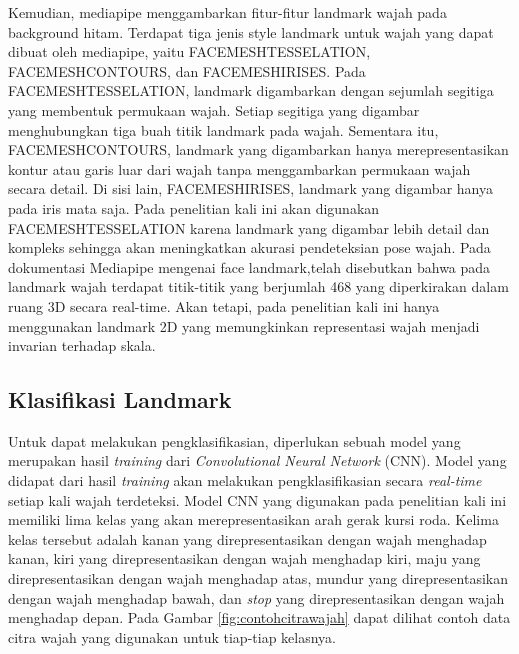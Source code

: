 Kemudian, mediapipe menggambarkan fitur-fitur landmark wajah pada background hitam. Terdapat tiga jenis style landmark untuk wajah yang dapat dibuat oleh mediapipe, yaitu FACEMESH\textunderscore TESSELATION, FACEMESH\textunderscore CONTOURS, dan FACEMESH\textunderscore IRISES. Pada FACEMESH\textunderscore TESSELATION, landmark digambarkan dengan sejumlah segitiga yang membentuk permukaan wajah. Setiap segitiga yang digambar menghubungkan tiga buah titik landmark pada wajah. Sementara itu, FACEMESH\textunderscore CONTOURS, landmark yang digambarkan hanya merepresentasikan kontur atau garis luar dari wajah tanpa menggambarkan permukaan wajah secara detail. Di sisi lain, FACEMESH\textunderscore IRISES, landmark yang digambar hanya pada iris mata saja. Pada penelitian kali ini akan digunakan FACEMESH\textunderscore TESSELATION karena landmark yang digambar lebih detail dan kompleks sehingga akan meningkatkan akurasi pendeteksian pose wajah. Pada dokumentasi Mediapipe mengenai face landmark,telah disebutkan bahwa pada landmark wajah terdapat titik-titik yang berjumlah 468 yang diperkirakan dalam ruang 3D secara real-time. Akan tetapi, pada penelitian kali ini hanya menggunakan landmark 2D yang memungkinkan representasi wajah menjadi invarian terhadap skala. 

\subsection{Klasifikasi Landmark}
Untuk dapat melakukan pengklasifikasian, diperlukan sebuah model yang merupakan hasil \emph{training} dari \emph{Convolutional Neural Network} (CNN). Model yang didapat dari hasil \emph{training} akan melakukan pengklasifikasian secara \emph{real-time} setiap kali wajah terdeteksi. Model CNN yang digunakan pada penelitian kali ini memiliki lima kelas yang akan merepresentasikan arah gerak kursi roda. Kelima kelas tersebut adalah kanan yang direpresentasikan dengan wajah menghadap kanan, kiri yang direpresentasikan dengan wajah menghadap kiri, maju yang direpresentasikan dengan wajah menghadap atas, mundur yang direpresentasikan dengan wajah menghadap bawah, dan \emph{stop} yang direpresentasikan dengan wajah menghadap depan. Pada Gambar \ref{fig:contohcitrawajah} dapat dilihat contoh data citra wajah yang digunakan untuk tiap-tiap kelasnya.

